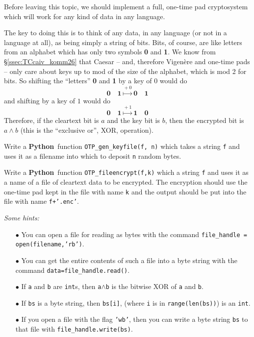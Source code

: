 \documentclass[12pt,letterpaper]{amsbook}
\theoremstyle{definition}
\theoremstyle{remark}
\numberwithin{figure}{section}
\numberwithin{exercise}{chapter}
\numberwithin{section}{chapter}
\numberwithin{equation}{section}
\numberwithin{table}{subsection}
\newcommand{\code}[1]{\colorbox{lg}{\texttt{#1}}}
\newcommand{\Python}{{\textbf{\ix{Python}}}}
\newcommand{\ix}[1]{{#1}\index{#1}}
\begin{document}
\vskip2mm
\begin{CTtcb}[label=ct:fullOTP]{}{}
 Before leaving this topic, we should implement a full, one-time pad
 cryptosystem which will work for any kind of data in any language.

 The key to doing this is to think of any data, in any language (or not in a
 language at all), as being simply a string of bits.  Bits, of course, are
 like letters from an alphabet which has only two symbols \textbf{0} and
 \textbf{1}.  We know from \S\ref{ssec:TCcaiv_komm26} that Caesar -- and,
 therefore Vigen\`ere and one-time pads -- only care about keys up to mod of
 the size of the alphabet, which is mod 2 for bits.  So shifting the ``letters''
 \textbf{0} and \textbf{1} by a key of $0$ would do
 $$
 {\mathbf0}\quad {\mathbf1}\overset{{}+0}{\mapsto} {\mathbf0}\quad {\mathbf1}
 $$
 and shifting by a key of $1$ would do
 $$
 {\mathbf0}\quad {\mathbf1}\overset{{}+1}{\mapsto} {\mathbf1}\quad {\mathbf0}
 $$
 Therefore, if the cleartext bit is $a$ and the key bit is $b$, then the
 encrypted bit is $a \wedge b$ (this is the
 ``\ix{exclusive or}'', \ix{XOR}, operation).

 Write a \Python\ function \code{OTP\_gen\_keyfile(f, n)} which takes a
 string  \code{f} and uses it as a filename into which to deposit
 \code{n} random bytes.
 
 Write a \Python\ function \code{OTP\_fileencrypt(f,k)} which a string
 \code{f} and uses it as a name of a file of cleartext data to be
 encrypted. The encryption should use the one-time  pad kept in the file
 with name \code{k} and the output should be put into the file with
 name \code{f+'.enc'}.

 \textit{Some hints:}
 \begin{itemize}
 \item[$\bullet$] You can open a file for reading as bytes with the command
 \code{file\_handle = open(filename,'rb')}.
 \item[$\bullet$] You can get the entire contents of such a file into a byte
 string with the command \code{data=file\_handle.read()}.
 \item[$\bullet$] If \code{a} and \code{b} are \code{int}s,
 then \code{a$\wedge$b} is the bitwise XOR of \code{a} and \code{b}.
 \item[$\bullet$] If \code{bs} is a byte string, then \code{bs[i]},
 (where \code{i} is in \code{range(len(bs))}) is an \code{int}.
 \item[$\bullet$] If you open a file with the flag \code{'wb'}, then
 you can write a byte string \code{bs} to that file with
 \code{file\_handle.write(bs)}.
 \end{itemize}
\end{CTtcb}
\end{document}
